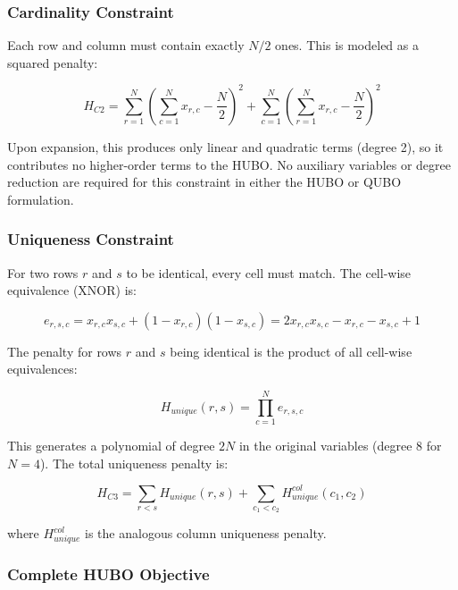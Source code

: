 \documentclass[eng]{ajceam-class}
\begin{document}
\subsubsection{Cardinality Constraint}

Each row and column must contain exactly $N/2$ ones. This is modeled as a squared penalty:

\begin{equation} \label{eq:cardinality}
 H_{C2} = \sum_{r=1}^{N} \left( \sum_{c=1}^{N} x_{r,c} - \frac{N}{2} \right)^2 + \sum_{c=1}^{N} \left( \sum_{r=1}^{N} x_{r,c} - \frac{N}{2} \right)^2
\end{equation}

Upon expansion, this produces only linear and quadratic terms (degree 2), so it contributes no higher-order terms to the HUBO. No auxiliary variables or degree reduction are required for this constraint in either the HUBO or QUBO formulation.

\subsubsection{Uniqueness Constraint}

For two rows $r$ and $s$ to be identical, every cell must match. The cell-wise equivalence (XNOR) is:

\begin{equation} \label{eq:xnor}
 e_{r,s,c} = x_{r,c} x_{s,c} + (1 - x_{r,c})(1 - x_{s,c}) = 2x_{r,c} x_{s,c} - x_{r,c} - x_{s,c} + 1
\end{equation}

The penalty for rows $r$ and $s$ being identical is the product of all cell-wise equivalences:

\begin{equation} \label{eq:uniqueness}
 H_{unique}(r,s) = \prod_{c=1}^{N} e_{r,s,c}
\end{equation}

This generates a polynomial of degree $2N$ in the original variables (degree 8 for $N=4$). The total uniqueness penalty is:

\begin{equation}
 H_{C3} = \sum_{r < s} H_{unique}(r,s) + \sum_{c_1 < c_2} H_{unique}^{col}(c_1, c_2)
\end{equation}

where $H_{unique}^{col}$ is the analogous column uniqueness penalty.

\subsubsection{Complete HUBO Objective}
\end{document}
